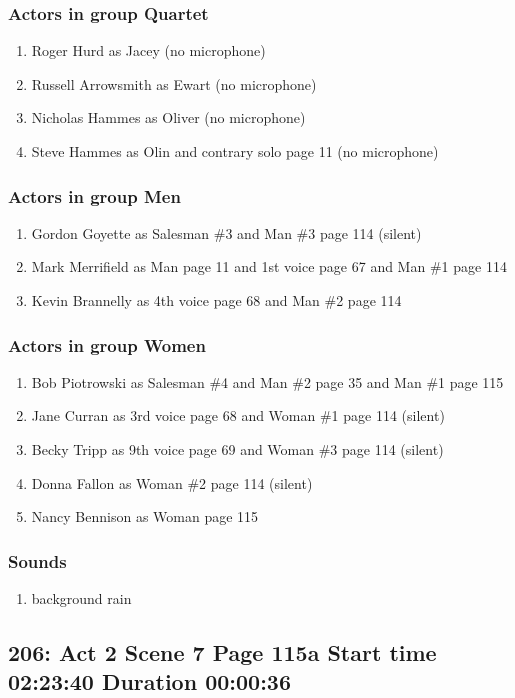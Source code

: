 \subsubsection{Actors in group Quartet}
\begin{enumerate}
\item Roger Hurd as Jacey (no microphone)
\item Russell Arrowsmith as Ewart (no microphone)
\item Nicholas Hammes as Oliver (no microphone)
\item Steve Hammes as Olin and contrary solo page 11 (no microphone)
\end{enumerate}
\subsubsection{Actors in group Men}
\begin{enumerate}
\item Gordon Goyette as Salesman \#3 and Man \#3 page 114 (silent)
\item Mark Merrifield as Man page 11 and 1st voice page 67 and Man \#1 page 114
\item Kevin Brannelly as 4th voice page 68 and Man \#2 page 114
\end{enumerate}
\subsubsection{Actors in group Women}
\begin{enumerate}
\item Bob Piotrowski as Salesman \#4 and Man \#2 page 35 and Man \#1 page 115
\item Jane Curran as 3rd voice page 68 and Woman \#1 page 114 (silent)
\item Becky Tripp as 9th voice page 69 and Woman \#3 page 114 (silent)
\item Donna Fallon as Woman \#2 page 114 (silent)
\item Nancy Bennison as Woman page 115
\end{enumerate}

\subsubsection{Sounds}
\begin{enumerate}
\item background rain
\end{enumerate}
\subsection{206: Act 2 Scene 7 Page 115a Start time 02:23:40 Duration 00:00:36}

